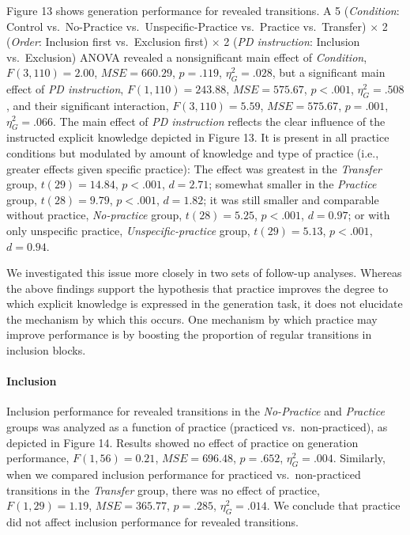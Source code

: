 \documentclass[floatsintext,man]{apa6}
\begin{document}
Figure 13 shows generation performance for revealed transitions. A 5
(\emph{Condition}: Control vs.~No-Practice vs.~Unspecific-Practice
vs.~Practice vs.~Transfer) \(\times\) 2 (\emph{Order}: Inclusion first
vs.~Exclusion first) \(\times\) 2 (\emph{PD instruction}: Inclusion
vs.~Exclusion) ANOVA revealed a nonsignificant main effect of
\emph{Condition}, \(F(3, 110) = 2.00\), \(\mathit{MSE} = 660.29\),
\(p = .119\), \(\eta^2_G = .028\), but a significant main effect of
\emph{PD instruction}, \(F(1, 110) = 243.88\),
\(\mathit{MSE} = 575.67\), \(p < .001\), \(\eta^2_G = .508\), and their
significant interaction, \(F(3, 110) = 5.59\),
\(\mathit{MSE} = 575.67\), \(p = .001\), \(\eta^2_G = .066\). The main
effect of \emph{PD instruction} reflects the clear influence of the
instructed explicit knowledge depicted in Figure 13. It is present in
all practice conditions but modulated by amount of knowledge and type of
practice (i.e., greater effects given specific practice): The effect was
greatest in the \emph{Transfer} group, \(t(29) = 14.84\), \(p < .001\),
\(d = 2.71\); somewhat smaller in the \emph{Practice} group,
\(t(28) = 9.79\), \(p < .001\), \(d = 1.82\); it was still smaller and
comparable without practice, \emph{No-practice} group, \(t(28) = 5.25\),
\(p < .001\), \(d = 0.97\); or with only unspecific practice,
\emph{Unspecific-practice} group, \(t(29) = 5.13\), \(p < .001\),
\(d = 0.94\).

We investigated this issue more closely in two sets of follow-up
analyses. Whereas the above findings support the hypothesis that
practice improves the degree to which explicit knowledge is expressed in
the generation task, it does not elucidate the mechanism by which this
occurs. One mechanism by which practice may improve performance is by
boosting the proportion of regular transitions in inclusion blocks.

\paragraph{Inclusion}\label{inclusion}



Inclusion performance for revealed transitions in the \emph{No-Practice}
and \emph{Practice} groups was analyzed as a function of practice
(practiced vs.~non-practiced), as depicted in Figure 14. Results showed
no effect of practice on generation performance, \(F(1, 56) = 0.21\),
\(\mathit{MSE} = 696.48\), \(p = .652\), \(\eta^2_G = .004\). Similarly,
when we compared inclusion performance for practiced vs.~non-practiced
transitions in the \emph{Transfer} group, there was no effect of
practice, \(F(1, 29) = 1.19\), \(\mathit{MSE} = 365.77\), \(p = .285\),
\(\eta^2_G = .014\). We conclude that practice did not affect inclusion
performance for revealed transitions.
\end{document}
